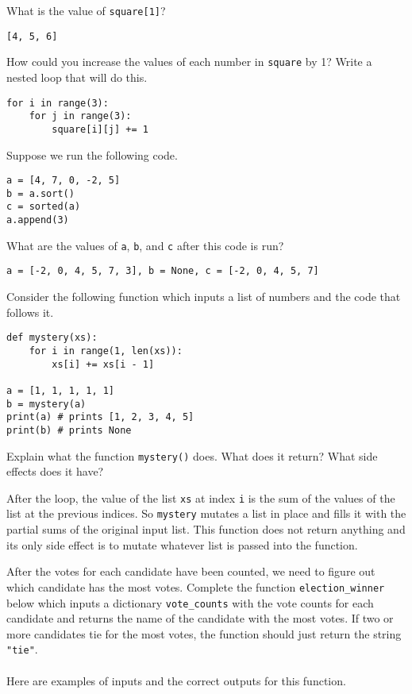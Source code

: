 \documentclass[12pt,answers]{exam}
\begin{document}
\begin{questions}
\begin{parts}
\item What is the value of \verb|square[1]|? 
\begin{solution}
\verb|[4, 5, 6]|
\end{solution}
\bigskip
\bigskip

\item How could you increase the values of each number in \verb|square| by 1? Write a nested loop that will do this.   
\begin{solution}
\begin{verbatim}
for i in range(3):
    for j in range(3):
        square[i][j] += 1
\end{verbatim}
\end{solution}
\vfill
\vfill
\end{parts}


\question Suppose we run the following code. 

\begin{verbatim}
a = [4, 7, 0, -2, 5]
b = a.sort()
c = sorted(a)
a.append(3)
\end{verbatim}

What are the values of \verb|a|, \verb|b|, and \verb|c| after this code is run? 
\begin{solution}
\verb|a = [-2, 0, 4, 5, 7, 3], b = None, c = [-2, 0, 4, 5, 7]|
\end{solution}
\vfill

\question Consider the following function which inputs a list of numbers and the code that follows it.
\begin{verbatim}
def mystery(xs): 
    for i in range(1, len(xs)):
        xs[i] += xs[i - 1]

a = [1, 1, 1, 1, 1]
b = mystery(a)
print(a) # prints [1, 2, 3, 4, 5]
print(b) # prints None
\end{verbatim}

Explain what the function \verb|mystery()| does.  What does it return?  What side effects does it have?  
\begin{solution}
After the loop, the value of the list \verb|xs| at index \verb|i| is the sum of the values of the list at the previous indices.  So \verb|mystery| mutates a list in place and fills it with the partial sums of the original input list.  This function does not return anything and its only side effect is to mutate whatever list is passed into the function.  
\end{solution}
\vfill
\vfill

\newpage
\question After the votes for each candidate have been counted, we need to figure out which candidate has the most votes. Complete the function \verb|election_winner| below which inputs a dictionary \verb|vote_counts| with the vote counts for each candidate and returns the name of the candidate with the most votes.  If two or more candidates tie for the most votes, the function should just return the string \verb|"tie"|. \\ \\
Here are examples of inputs and the correct outputs for this function.


\end{questions}
\end{document}

